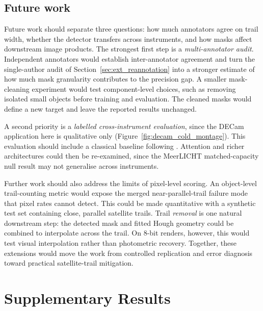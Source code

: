 \documentclass{cam-thesis}
\begin{document}
\section{Future work}
\label{sec:future}

Future work should separate three questions: how much annotators agree on trail
width, whether the detector transfers across instruments, and how masks affect
downstream image products. The strongest first step is a \emph{multi-annotator
audit}. Independent annotators would establish inter-annotator agreement and
turn the single-author audit of Section~\ref{sec:ext_reannotation} into a
stronger estimate of how much mask granularity contributes to the precision gap.
A smaller mask-cleaning experiment would test component-level choices, such as
removing isolated small objects before training and evaluation. The cleaned masks
would define a new target and leave the reported results unchanged.

A second priority is a \emph{labelled cross-instrument evaluation}, since the
DECam application here is qualitative only
(Figure~\ref{fig:decam_cold_montage}). This evaluation should include a
classical baseline following \citet{serrano2026}. Attention
\citep{oktay2018} and richer architectures could then be re-examined, since the
MeerLICHT matched-capacity null result may not generalise across instruments.

Further work should also address the limits of pixel-level scoring. An
object-level trail-counting metric would expose the merged near-parallel-trail
failure mode that pixel rates cannot detect. This could be made quantitative
with a synthetic test set containing close, parallel satellite trails. Trail
\emph{removal} is one natural downstream step: the detected mask and fitted
Hough geometry could be combined to interpolate across the trail. On 8-bit
renders, however, this would test visual interpolation rather than photometric
recovery. Together, these extensions would move the work from controlled
replication and error diagnosis toward practical satellite-trail mitigation.

\cleardoublepage
{}
{}



\appendix

\chapter{Supplementary Results}
\label{app:supplementary}
\end{document}
